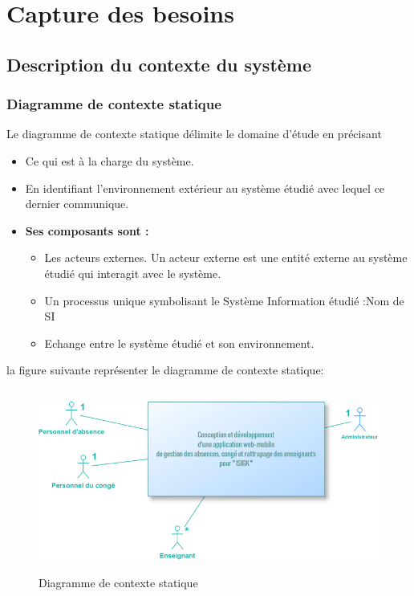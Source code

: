 \documentclass[12 pt]{report}
\begin{document}
\section{Capture des besoins}
\subsection{Description du contexte du système}
\subsubsection{Diagramme de contexte statique}


Le diagramme de contexte statique délimite le domaine d’étude en précisant 
\begin{itemize}[font=\color{black} \Large, label=]

	\item Ce qui est à la charge du système.
	\item En identifiant l’environnement extérieur au système étudié avec lequel ce dernier communique. 
\end{itemize}
\newpage
\begin{itemize}[font=\color{black} \Large, label=]
\item \textbf{Ses composants sont : }
\begin{itemize}[font=\color{black} \Large, label=]
\item Les acteurs externes. Un acteur externe est une entité externe au système étudié qui interagit avec le système. 
\item  Un processus unique symbolisant le Système Information étudié :Nom de SI
\item Echange entre le système étudié et son environnement.
\end{itemize}

\end{itemize}


la figure suivante représenter le diagramme de contexte statique:
\begin{center}
\begin{figure}[h]
\includegraphics[width= 17 cm ,height= 6cm]{c.png}
\caption{ Diagramme de contexte statique}
\end{figure}
\end{center}
\end{document}
